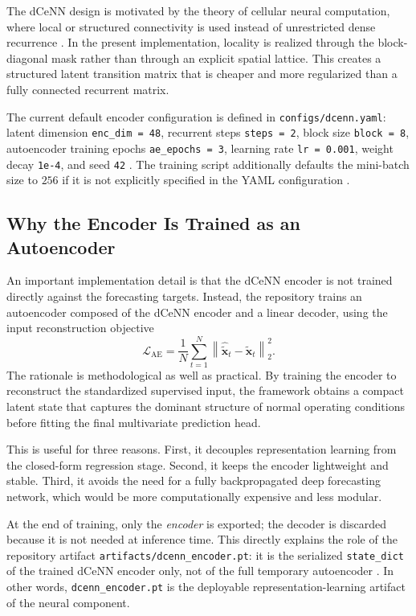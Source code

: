 The dCeNN design is motivated by the theory of cellular neural computation, where local or structured connectivity is used instead of unrestricted dense recurrence \cite{chua1988cellular}. In the present implementation, locality is realized through the block-diagonal mask rather than through an explicit spatial lattice. This creates a structured latent transition matrix that is cheaper and more regularized than a fully connected recurrent matrix.

The current default encoder configuration is defined in \texttt{configs/dcenn.yaml}: latent dimension \texttt{enc\_dim = 48}, recurrent steps \texttt{steps = 2}, block size \texttt{block = 8}, autoencoder training epochs \texttt{ae\_epochs = 3}, learning rate \texttt{lr = 0.001}, weight decay \texttt{1e-4}, and seed \texttt{42} \cite{repo_thesis_grid_anomaly}. The training script additionally defaults the mini-batch size to $256$ if it is not explicitly specified in the YAML configuration \cite{repo_thesis_grid_anomaly}.

\subsection{Why the Encoder Is Trained as an Autoencoder}

An important implementation detail is that the dCeNN encoder is not trained directly against the forecasting targets. Instead, the repository trains an autoencoder composed of the dCeNN encoder and a linear decoder, using the input reconstruction objective
\begin{equation}
	\mathcal{L}_{\mathrm{AE}}
	=
	\frac{1}{N}
	\sum_{t=1}^{N}
	\left\|
	\hat{\tilde{\mathbf{x}}}_t - \tilde{\mathbf{x}}_t
	\right\|_2^2.
	\label{eq:dcenn_autoencoder_loss}
\end{equation}
The rationale is methodological as well as practical. By training the encoder to reconstruct the standardized supervised input, the framework obtains a compact latent state that captures the dominant structure of normal operating conditions before fitting the final multivariate prediction head.

This is useful for three reasons. First, it decouples representation learning from the closed-form regression stage. Second, it keeps the encoder lightweight and stable. Third, it avoids the need for a fully backpropagated deep forecasting network, which would be more computationally expensive and less modular.

At the end of training, only the \emph{encoder} is exported; the decoder is discarded because it is not needed at inference time. This directly explains the role of the repository artifact \texttt{artifacts/dcenn\_encoder.pt}: it is the serialized \texttt{state\_dict} of the trained dCeNN encoder only, not of the full temporary autoencoder \cite{repo_thesis_grid_anomaly}. In other words, \texttt{dcenn\_encoder.pt} is the deployable representation-learning artifact of the neural component.

